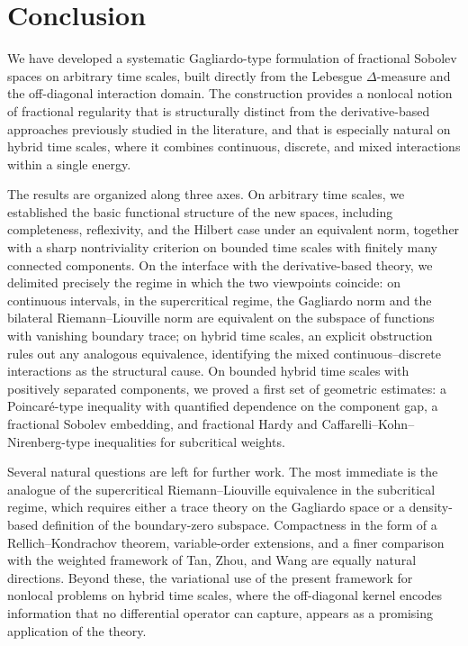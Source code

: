 \documentclass[11pt,a4paper]{article}
\numberwithin{equation}{section}
\theoremstyle{definition}
\begin{document}

\section{Conclusion}
\label{sec:conclusion}

We have developed a systematic Gagliardo-type formulation of fractional Sobolev spaces on arbitrary time scales, built directly from the Lebesgue $\Delta$-measure and the off-diagonal interaction domain. The construction provides a nonlocal notion of fractional regularity that is structurally distinct from the derivative-based approaches previously studied in the literature, and that is especially natural on hybrid time scales, where it combines continuous, discrete, and mixed interactions within a single energy.

The results are organized along three axes. On arbitrary time scales, we established the basic functional structure of the new spaces, including completeness, reflexivity, and the Hilbert case under an equivalent norm, together with a sharp nontriviality criterion on bounded time scales with finitely many connected components. On the interface with the derivative-based theory, we delimited precisely the regime in which the two viewpoints coincide: on continuous intervals, in the supercritical regime, the Gagliardo norm and the bilateral Riemann--Liouville norm are equivalent on the subspace of functions with vanishing boundary trace; on hybrid time scales, an explicit obstruction rules out any analogous equivalence, identifying the mixed continuous--discrete interactions as the structural cause. On bounded hybrid time scales with positively separated components, we proved a first set of geometric estimates: a Poincar\'e-type inequality with quantified dependence on the component gap, a fractional Sobolev embedding, and fractional Hardy and Caffarelli--Kohn--Nirenberg-type inequalities for subcritical weights.

Several natural questions are left for further work. The most immediate is the analogue of the supercritical Riemann--Liouville equivalence in the subcritical regime, which requires either a trace theory on the Gagliardo space or a density-based definition of the boundary-zero subspace. Compactness in the form of a Rellich--Kondrachov theorem, variable-order extensions, and a finer comparison with the weighted framework of Tan, Zhou, and Wang are equally natural directions. Beyond these, the variational use of the present framework for nonlocal problems on hybrid time scales, where the off-diagonal kernel encodes information that no differential operator can capture, appears as a promising application of the theory.
\end{document}
